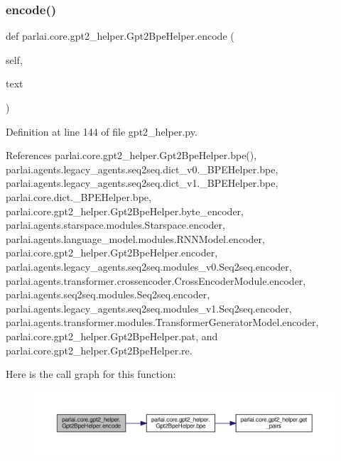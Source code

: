 \subsubsection{\texorpdfstring{encode()}{encode()}}
{\footnotesize\ttfamily def parlai.\+core.\+gpt2\+\_\+helper.\+Gpt2\+Bpe\+Helper.\+encode (\begin{DoxyParamCaption}\item[{}]{self,  }\item[{}]{text }\end{DoxyParamCaption})}



Definition at line 144 of file gpt2\+\_\+helper.\+py.



References parlai.\+core.\+gpt2\+\_\+helper.\+Gpt2\+Bpe\+Helper.\+bpe(), parlai.\+agents.\+legacy\+\_\+agents.\+seq2seq.\+dict\+\_\+v0.\+\_\+\+B\+P\+E\+Helper.\+bpe, parlai.\+agents.\+legacy\+\_\+agents.\+seq2seq.\+dict\+\_\+v1.\+\_\+\+B\+P\+E\+Helper.\+bpe, parlai.\+core.\+dict.\+\_\+\+B\+P\+E\+Helper.\+bpe, parlai.\+core.\+gpt2\+\_\+helper.\+Gpt2\+Bpe\+Helper.\+byte\+\_\+encoder, parlai.\+agents.\+starspace.\+modules.\+Starspace.\+encoder, parlai.\+agents.\+language\+\_\+model.\+modules.\+R\+N\+N\+Model.\+encoder, parlai.\+core.\+gpt2\+\_\+helper.\+Gpt2\+Bpe\+Helper.\+encoder, parlai.\+agents.\+legacy\+\_\+agents.\+seq2seq.\+modules\+\_\+v0.\+Seq2seq.\+encoder, parlai.\+agents.\+transformer.\+crossencoder.\+Cross\+Encoder\+Module.\+encoder, parlai.\+agents.\+seq2seq.\+modules.\+Seq2seq.\+encoder, parlai.\+agents.\+legacy\+\_\+agents.\+seq2seq.\+modules\+\_\+v1.\+Seq2seq.\+encoder, parlai.\+agents.\+transformer.\+modules.\+Transformer\+Generator\+Model.\+encoder, parlai.\+core.\+gpt2\+\_\+helper.\+Gpt2\+Bpe\+Helper.\+pat, and parlai.\+core.\+gpt2\+\_\+helper.\+Gpt2\+Bpe\+Helper.\+re.

Here is the call graph for this function\+:
\nopagebreak
\begin{figure}[H]
\begin{center}
\leavevmode
\includegraphics[width=350pt]{classparlai_1_1core_1_1gpt2__helper_1_1Gpt2BpeHelper_a7c5c94aa8d5acd15215cf3e45fc9f2c3_cgraph}
\end{center}
\end{figure}
\mbox{\label{classparlai_1_1core_1_1gpt2__helper_1_1Gpt2BpeHelper_a36f3a5cb4264010b4891605508147442}} 
